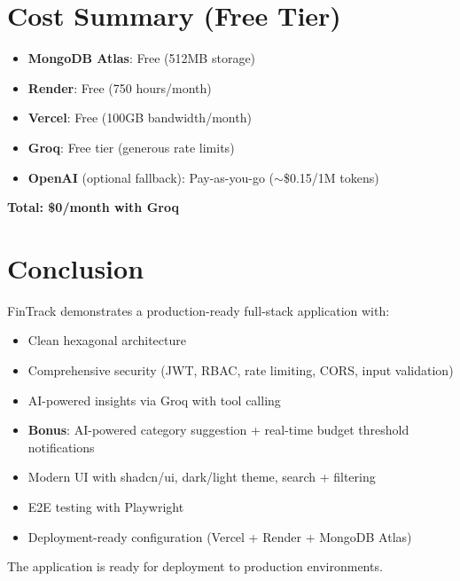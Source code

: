\documentclass[11pt,a4paper]{article}
\begin{document}
\section{Cost Summary (Free Tier)}

\begin{itemize}[leftmargin=*,itemsep=2pt]
  \item \textbf{MongoDB Atlas}: Free (512MB storage)
  \item \textbf{Render}: Free (750 hours/month)
  \item \textbf{Vercel}: Free (100GB bandwidth/month)
  \item \textbf{Groq}: Free tier (generous rate limits)
  \item \textbf{OpenAI} (optional fallback): Pay-as-you-go ($\sim$\$0.15/1M tokens)
\end{itemize}

\textbf{Total: \$0/month with Groq}

\section{Conclusion}

FinTrack demonstrates a production-ready full-stack application with:
\begin{itemize}[leftmargin=*,itemsep=2pt]
  \item Clean hexagonal architecture
  \item Comprehensive security (JWT, RBAC, rate limiting, CORS, input validation)
  \item AI-powered insights via Groq with tool calling
  \item \textbf{Bonus}: AI-powered category suggestion + real-time budget threshold notifications
  \item Modern UI with shadcn/ui, dark/light theme, search + filtering
  \item E2E testing with Playwright
  \item Deployment-ready configuration (Vercel + Render + MongoDB Atlas)
\end{itemize}

The application is ready for deployment to production environments.
\end{document}
